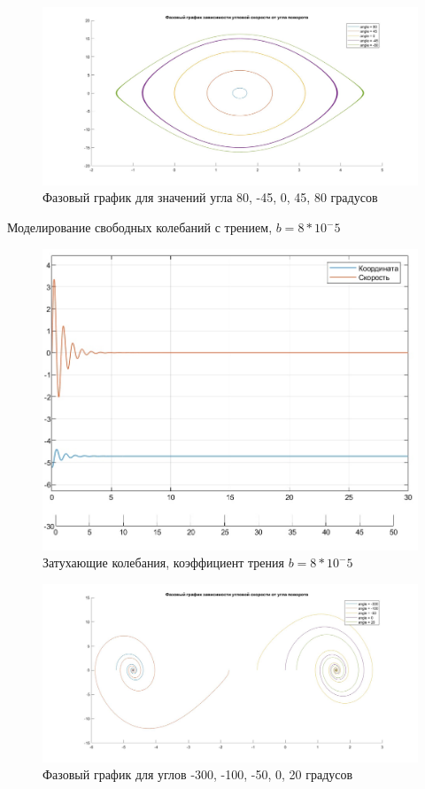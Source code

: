 \documentclass{article}
\begin{document}
	\begin{figure}[H]
		\centering
		\includegraphics[width=1\linewidth]{pphase1}
		\caption{Фазовый график для значений угла 80, -45, 0, 45, 80 градусов}
		\label{fig:pphase1}
	\end{figure}
	Моделирование свободных колебаний с трением, $b=8*10^-5$
	\begin{figure}[H]
		\centering
		\includegraphics[width=0.7\linewidth]{zatuch}
		\caption{Затухающие колебания, коэффициент трения $b = 8*10^-5$}
		\label{fig:zatuch}
	\end{figure}
	\begin{figure}[H]
		\centering
		\includegraphics[width=0.7\linewidth]{pphase2}
		\caption{Фазовый график для углов -300, -100, -50, 0, 20 градусов}
		\label{fig:pphase2}
	\end{figure}
\end{document}
